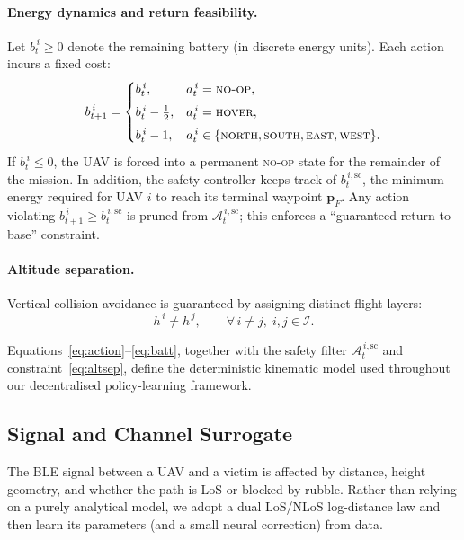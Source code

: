 \documentclass[drones,article,accept,pdftex,moreauthors]{Definitions/mdpi}
\begin{document}
\paragraph{Energy dynamics and return feasibility.}
Let \(b_t^{\,i}\ge0\) denote the remaining battery (in discrete energy units). Each action
incurs a fixed cost:
\begin{equation}
b_{t+1}^{\,i} =
\begin{cases}
b_t^{\,i}, & a_t^{\,i}=\textsc{no-op}, \\[4pt]
b_t^{\,i} - \tfrac{1}{2}, & a_t^{\,i}=\textsc{hover}, \\[4pt]
b_t^{\,i} - 1, & a_t^{\,i}\in\{\textsc{north},\textsc{south},\textsc{east},\textsc{west}\}.
\end{cases}
\label{eq:batt}
\end{equation}
If \(b_t^{\,i}\le 0\), the UAV is forced into a permanent \textsc{no-op} state for the
remainder of the mission. In addition, the safety controller keeps track of
\(b_t^{\,i,\mathrm{sc}}\), the minimum energy required for UAV \(i\) to reach its terminal
waypoint \(\mathbf{p}_F\). Any action violating \(b_{t+1}^{\,i} \ge b_t^{\,i,\mathrm{sc}}\) is pruned from
\(\mathcal{A}_t^{\,i,\mathrm{sc}}\); this enforces a ``guaranteed return-to-base'' constraint.

\paragraph{Altitude separation.}
Vertical collision avoidance is guaranteed by assigning distinct flight layers:
\begin{equation}
h^{\,i} \neq h^{\,j}, \qquad \forall\, i\neq j,\; i,j\in\mathcal{I}.
\label{eq:altsep}
\end{equation}

\medskip
\noindent
Equations~\eqref{eq:action}–\eqref{eq:batt}, together with the safety filter
\(\mathcal{A}_t^{\,i,\mathrm{sc}}\) and constraint~\eqref{eq:altsep}, define the deterministic
kinematic model used throughout our decentralised policy-learning framework.

\subsection{Signal and Channel Surrogate}\label{sec:channel}

The BLE signal between a UAV and a victim is affected by distance, height geometry,
and whether the path is LoS or blocked by rubble. Rather than relying on a purely
analytical model, we adopt a dual LoS/NLoS log-distance law and then learn its
parameters (and a small neural correction) from data.
\end{document}
